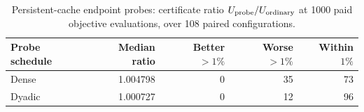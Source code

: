 \begin{table}[htbp]
\centering
\small
\caption{Persistent-cache endpoint probes: certificate ratio $U_{\rm probe}/U_{\rm ordinary}$ at 1000 paid objective evaluations, over 108 paired configurations.}
\label{endpoint:table}
\begin{tabular}{lrrrr}
\toprule
Probe schedule & Median ratio & Better $>1\%$ & Worse $>1\%$ & Within $1\%$ \\
\midrule
Dense & 1.004798 & 0 & 35 & 73 \\
Dyadic & 1.000727 & 0 & 12 & 96 \\
\bottomrule
\end{tabular}
\end{table}
